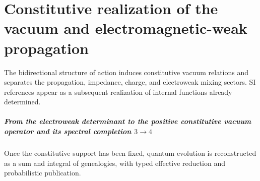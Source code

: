 \chapter{Constitutive realization of the vacuum and electromagnetic-weak propagation}
\label{chap:parte-iv-52}

The bidirectional structure of action induces constitutive vacuum relations and separates the propagation, impedance, charge, and electroweak mixing sectors. SI references appear as a subsequent realization of internal functions already determined.





\paragraph{From the electroweak determinant to the positive constitutive vacuum operator and its spectral completion \(3\to4\)} Once the constitutive support has been fixed, quantum evolution is reconstructed as a sum and integral of genealogies, with typed effective reduction and probabilistic publication.
